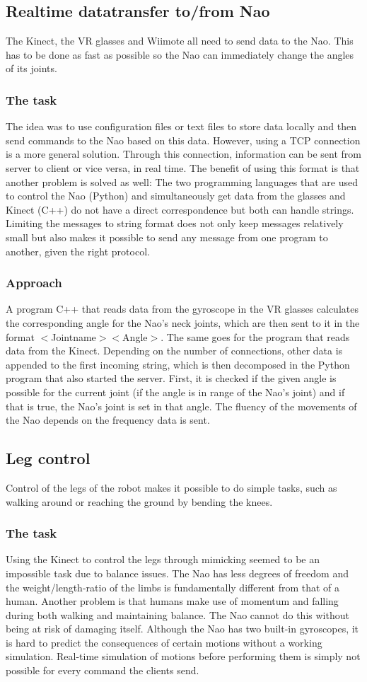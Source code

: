 \documentclass[letterpaper, 10pt, conference]{ieeeconf}
\begin{document}
\subsection{Realtime datatransfer to/from Nao}
The Kinect, the VR glasses and Wiimote all need to send data to the Nao.
This has to be done as fast as possible so the Nao can immediately change the angles of its joints.
\subsubsection{The task}
The idea was to use configuration files or text files to store data locally and then send commands to the Nao based on this data. 
However, using a TCP connection is a more general solution. Through this connection, information can be sent from server to client or vice versa, in real time.
The benefit of using this format is that another problem is solved as well: The two programming languages that are used to control the Nao (Python) and simultaneously get data from the glasses and Kinect (C++) do not have a direct correspondence but both can handle strings. Limiting the messages to string format does not only keep messages relatively small but also makes it possible to send any message from one program to another, given the right protocol.
\subsubsection{Approach}
A program C++ that reads data from the gyroscope in the VR glasses calculates the corresponding angle for the Nao’s neck joints, which are then sent to it in the format $<$Jointname$> <$Angle$>$. The same goes for the program that reads data from the Kinect. Depending on the number of connections, other data is appended to the first incoming string, which is then decomposed in the Python program that also started the server. First, it is checked if the given angle is possible for the current joint (if the angle is in range of the Nao’s joint) and if that is true, the Nao’s joint is set in that angle. The fluency of the movements of the Nao depends on the frequency data is sent.
\subsection{Leg control}
Control of the legs of the robot makes it possible to do simple tasks, such as walking around or reaching the ground by bending the knees.
\subsubsection{The task}
Using the Kinect to control the legs through mimicking seemed to be an impossible task due to balance issues. The Nao has less degrees of freedom and the weight/length-ratio of the limbs is fundamentally different from that of a human. Another problem is that humans make use of momentum and falling during both walking and maintaining balance. The Nao cannot do this without being at risk of damaging itself. Although the Nao has two built-in gyroscopes, it is hard to predict the consequences of certain motions without a working simulation. Real-time simulation of motions before performing them is simply not possible for every command the clients send.
\end{document}
